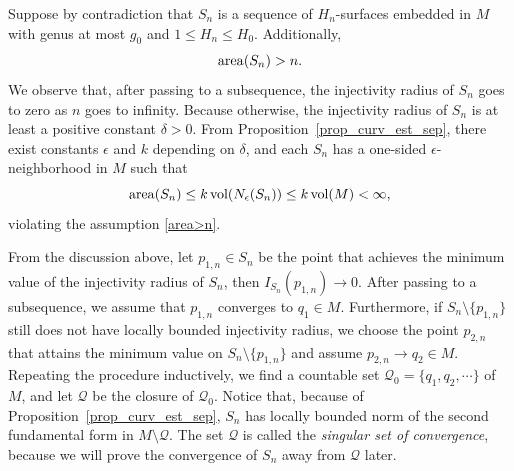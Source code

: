 \documentclass[12pt,a4paper]{amsart}
\numberwithin{equation}{section}
\theoremstyle{plain}
\theoremstyle{named}
\theoremstyle{definition}
\newcommand{\area}{{\rm{area}}}
\begin{document}
         Suppose by contradiction that $S_n$ is a sequence of $H_n$-surfaces embedded in $M$ with genus at most $g_0$ and $1\leq H_n\leq H_0$. Additionally, \begin{equation}\label{area>n}
            \area(S_n)>n.
        \end{equation}
        We observe that, after passing to a subsequence, the injectivity radius of $S_n$ goes to zero as $n$ goes to infinity. Because otherwise, the injectivity radius of $S_n$ is at least a positive constant $\delta>0$. 
       From Proposition~\ref{prop_curv_est_sep}, there exist constants $\epsilon$ and $k$ depending on $\delta$, and each $S_n$ has a one-sided $\epsilon$-neighborhood in $M$ such that \begin{equation*}
           \area(S_n)\leq k\, \text{vol}(N_\epsilon(S_n))\leq k\,\text{vol}(M)<\infty,
       \end{equation*}
       violating the assumption \eqref{area>n}. 

       From the discussion above, let $p_{1,n}\in S_n$ be the point that achieves the minimum value of the injectivity radius of $S_n$, then $I_{S_n}(p_{1,n})\rightarrow 0$. After passing to a subsequence, we assume that $p_{1,n}$ converges to $q_1\in M$. Furthermore, if $S_n\setminus\{p_{1,n}\}$ still does not have locally bounded injectivity radius, we choose the point $p_{2,n}$ that attains the minimum value on $S_n\setminus\{p_{1,n}\}$ and assume $p_{2,n}\rightarrow q_2\in M$. Repeating the procedure inductively, we find a countable set $\mathcal{Q}_0=\{q_1,q_2,\cdots\}$ of $M$, and let $\mathcal{Q}$ be the closure of $\mathcal{Q}_0$. Notice that, because of Proposition~\ref{prop_curv_est_sep}, $S_n$ has locally bounded norm of the second fundamental form in $M\setminus\mathcal{Q}$. The set $\mathcal{Q}$ is called the \emph{singular set of convergence}, because we will prove the convergence of $S_n$ away from $\mathcal{Q}$ later. 
       
\end{document}
